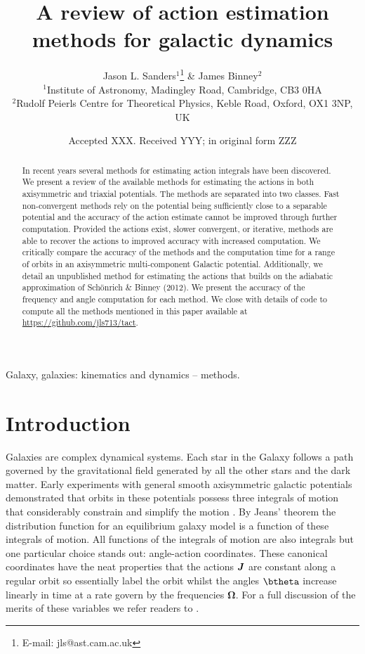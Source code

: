 \documentclass[useAMS,usenatbib,fleqn,a4paper]{mn2e}
\title{A review of action estimation methods for galactic dynamics}
\author[J. L. Sanders \& J. Binney]{Jason L. Sanders$^1$\thanks{E-mail: jls@ast.cam.ac.uk} \& James Binney$^2$\\
$^1$Institute of Astronomy, Madingley Road, Cambridge, CB3 0HA\\
$^2$Rudolf Peierls Centre for Theoretical Physics, Keble Road, Oxford, OX1 3NP, UK}
\date{Accepted XXX. Received YYY; in original form ZZZ}
\newcommand{\bs}[1]{\bmath{#1}}
\begin{document}
\label{firstpage}
\pagerange{\pageref{firstpage}--\pageref{lastpage}} 
\maketitle
\begin{abstract}
In recent years several methods for estimating action integrals have been discovered. We present a review of the available methods for estimating the actions in both axisymmetric and triaxial potentials. The methods are separated into two classes. Fast non-convergent methods rely on the potential being sufficiently close to a separable potential and the accuracy of the action estimate cannot be improved through further computation. Provided the actions exist, slower convergent, or iterative, methods are able to recover the actions to improved accuracy with increased computation. We critically compare the accuracy of the methods and the computation time for a range of orbits in an axisymmetric multi-component Galactic potential. Additionally, we detail an unpublished method for estimating the actions that builds on the adiabatic approximation of Sch\"onrich \& Binney (2012). We present the accuracy of the frequency and angle computation for each method. We close with details of code to compute all the methods mentioned in this paper available at \href{https://github.com/jls713/tact}{https://github.com/jls713/tact}.
\end{abstract}

\begin{keywords}
Galaxy, galaxies: kinematics and dynamics -- methods.
\end{keywords}

\section{Introduction}
Galaxies are complex dynamical systems. Each star in the Galaxy follows a path governed by the gravitational field generated by all the other stars and the dark matter. Early experiments with general smooth axisymmetric galactic potentials demonstrated that orbits in these potentials possess three integrals of motion that considerably constrain and simplify the motion \citep{Ollongren1962}. By Jeans' theorem the distribution function for an equilibrium galaxy model is a function of these integrals of motion. All functions of the integrals of motion are also integrals but one particular choice stands out: angle-action coordinates. These canonical coordinates have the neat properties that the actions $\bs{J}$ are constant along a regular orbit so essentially label the orbit whilst the angles $\btheta$ increase linearly in time at a rate govern by the frequencies $\boldsymbol{\Omega}$. For a full discussion of the merits of these variables we refer readers to \cite{BinneyTremaine}.
\end{document}
